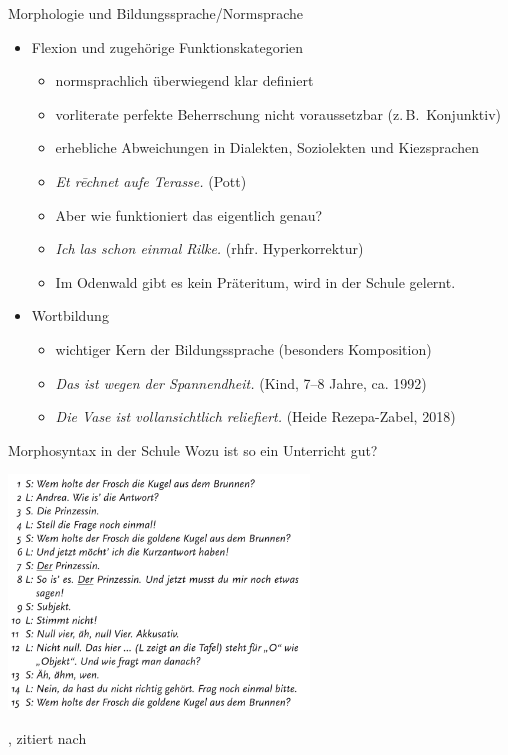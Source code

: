 \begin{frame}
  {Morphologie und Bildungssprache\slash Normsprache}
  \pause
  \begin{itemize}[<+->]
    \item Flexion und zugehörige Funktionskategorien
      \begin{itemize}[<+->]
        \item normsprachlich überwiegend \alert{klar definiert}
        \item vorliterate perfekte Beherrschung nicht voraussetzbar (z.\,B.\ Konjunktiv)
          \Halbzeile
        \item erhebliche Abweichungen in \alert{Dialekten}, \alert{Soziolekten} und \alert{Kiezsprachen}
          \Halbzeile
        \item \textit{Et rēchnet aufe Terasse.} (Pott)
        \item Aber wie funktioniert das eigentlich genau?
          \Halbzeile
        \item \textit{Ich las schon einmal Rilke.} (rhfr. Hyperkorrektur)
        \item Im Odenwald gibt es kein Präteritum, wird in der Schule gelernt.
      \end{itemize}
     \Halbzeile 
    \item Wortbildung
      \begin{itemize}[<+->]
        \item wichtiger Kern der Bildungssprache (besonders Komposition)
          \Halbzeile
        \item \textit{Das ist wegen der Spannendheit.} (Kind, 7--8 Jahre, ca. 1992)
        \item \textit{Die Vase ist vollansichtlich reliefiert.} (Heide Rezepa-Zabel, 2018)
      \end{itemize}
  \end{itemize}
\end{frame}

\begin{frame}
  {Morphosyntax in der Schule}
  \pause
  Wozu ist so ein Unterricht gut?
  \pause
  \begin{center}
    \includegraphics[width=0.6\textwidth]{graphics/kasusschule1}
  \end{center}
  \tiny \citet[36--37]{Gramzowemden2002}, zitiert nach \citet[257--258]{Bredel2013}
\end{frame}

